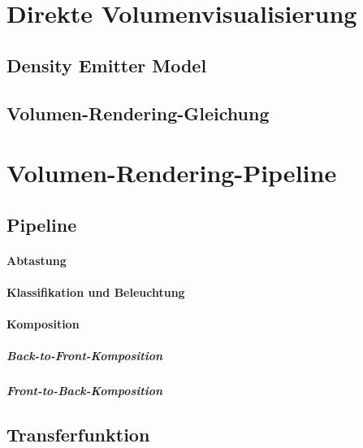 \documentclass[a4paper, 11pt, accentcolor = tud3b]{tudreport}
\begin{document}
		\section{Direkte Volumenvisualisierung} %

			\subsection{Density Emitter Model} %

			\subsection{Volumen-Rendering-Gleichung} %

		\section{Volumen-Rendering-Pipeline} %

			\subsection{Pipeline} %

				\paragraph{Abtastung} %

				\paragraph{Klassifikation und Beleuchtung} %

				\paragraph{Komposition} %

					\subparagraph{Back-to-Front-Komposition} %

					\subparagraph{Front-to-Back-Komposition} %

			\subsection{Transferfunktion} %
\end{document}

